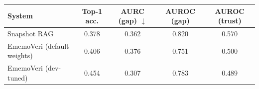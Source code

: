 \begin{tabular}{lcccc}
\toprule
System & Top-1 acc. & AURC (gap) $\downarrow$ & AUROC (gap) & AUROC (trust) \\
\midrule
Snapshot RAG & 0.378 & 0.362 & 0.820 & 0.570 \\
EmemoVeri (default weights) & 0.406 & 0.376 & 0.751 & 0.500 \\
EmemoVeri (dev-tuned) & 0.454 & 0.307 & 0.783 & 0.489 \\
\bottomrule
\end{tabular}